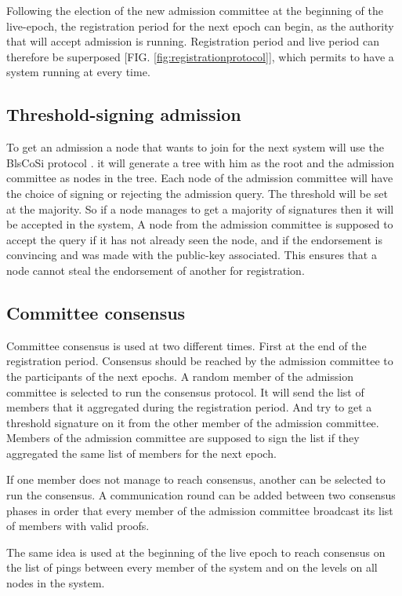 \documentclass[a4paper,11pt,oneside]{report}
\begin{document}
Following the election of the new admission committee at the beginning of the
live-epoch, the registration period for the next epoch can begin, as the
authority that will accept admission is running. Registration period and live
period can therefore be superposed [FIG. \ref{fig:registrationprotocol}], which
permits to have a system running at every time. 

\subsection{Threshold-signing admission}
To get an admission a node that wants to join for the next system will use the
BlsCoSi protocol \cite{BlsCoSi_protocol}. it will generate a tree with him as
the root and the admission committee as nodes in the tree. Each node of the
admission committee will have the choice of signing or rejecting the admission
query. The threshold will be set at the majority. So if a node manages to get a
majority of signatures then it will be accepted in the system, A node from the
admission committee is supposed to accept the query if it has not already seen
the node, and if the endorsement is convincing and was made with the public-key
associated. This ensures that a node cannot steal the endorsement of another
for registration.  

\subsection{Committee consensus}
Committee consensus is used at two different times. First at the end of the
registration period. Consensus should be reached by the admission committee to
the participants of the next epochs. A random member of the admission committee
is selected to run the consensus protocol. It will send the list of members
that it aggregated during the registration period. And try to get a threshold
signature on it from the other member of the admission committee. Members of
the admission committee are supposed to sign the list if they aggregated the
same list of members for the next epoch.

If one member does not manage to reach consensus, another can be selected to
run the consensus. A communication round can be added between two consensus
phases in order that every member of the admission committee broadcast its list
of members with valid proofs.

The same idea is used at the beginning of the live epoch to reach consensus on
the list of pings between every member of the system and on the levels on all
nodes in the system.
\end{document}
